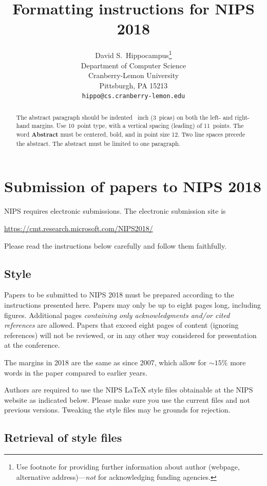 \documentclass{article}
\title{Formatting instructions for NIPS 2018}
\author{
  David S.~Hippocampus\thanks{Use footnote for providing further
    information about author (webpage, alternative
    address)---\emph{not} for acknowledging funding agencies.} \\
  Department of Computer Science\\
  Cranberry-Lemon University\\
  Pittsburgh, PA 15213 \\
  \texttt{hippo@cs.cranberry-lemon.edu} \\
}
\begin{document}

\maketitle

\begin{abstract}
  The abstract paragraph should be indented ~inch
  (3~picas) on both the left- and right-hand margins. Use 10~point
  type, with a vertical spacing (leading) of 11~points.  The word
  \textbf{Abstract} must be centered, bold, and in point size 12. Two
  line spaces precede the abstract. The abstract must be limited to
  one paragraph.
\end{abstract}

\section{Submission of papers to NIPS 2018}

NIPS requires electronic submissions.  The electronic submission site
is
\begin{center}
  \url{https://cmt.research.microsoft.com/NIPS2018/}
\end{center}

Please read the instructions below carefully and follow them faithfully.

\subsection{Style}

Papers to be submitted to NIPS 2018 must be prepared according to the
instructions presented here. Papers may only be up to eight pages
long, including figures. Additional pages \emph{containing only
  acknowledgments and/or cited references} are allowed. Papers that
exceed eight pages of content (ignoring references) will not be
reviewed, or in any other way considered for presentation at the
conference.

The margins in 2018 are the same as since 2007, which allow for
$\sim$$15\%$ more words in the paper compared to earlier years.

Authors are required to use the NIPS \LaTeX{} style files obtainable
at the NIPS website as indicated below. Please make sure you use the
current files and not previous versions. Tweaking the style files may
be grounds for rejection.

\subsection{Retrieval of style files}
\end{document}
